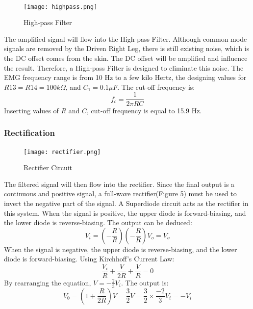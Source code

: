 \documentclass[12pt]{article}
\begin{document}
    \paragraph{}
    \begin{wrapfigure}{c}{2.5cm}
    \texttt{[image: highpass.png]}
    \caption{High-pass Filter}
    \end{wrapfigure}
    The amplified signal will flow into the High-pass Filter. Although common mode signals are removed by the Driven Right Leg, there is still existing noise, which is the  DC offset comes from the skin. The DC offset will be amplified and influence the result. Therefore, a High-pass Filter is designed to eliminate this noise. The EMG frequency range is from 10 Hz to a few kilo Hertz, the designing values for $R13=R14=100k\Omega$, and $C_1=0.1\mu F$. The cut-off frequency is:
    \begin{equation}
                    f_c = \frac{1}{2 \pi R C}
    \end{equation}
    Inserting values of $R$ and $C$, cut-off frequency is equal to 15.9 Hz.
    
    \subsubsection{Rectification}
    \paragraph{}
    \begin{figure}[H]
            \centering
            \texttt{[image: rectifier.png]}
            \caption{Rectifier Circuit}
        \end{figure}
    The filtered signal will then flow into the rectifier. Since the final output is a continuous and positive signal, a full-wave rectifier(Figure 5) must be used to invert the negative part of the signal. A Superdiode circuit acts as the rectifier in this system. When the signal is positive, the upper diode is forward-biasing, and the lower diode is reverse-biasing. The output can be deduced:
    \begin{equation}
                   V_i=\left ( -\frac{R}{R} \right )\left ( -\frac{R}{R} \right )V_o=V_o
    \end{equation}
    When the signal is negative, the upper diode is reverse-biasing, and the lower diode is forward-biasing. Using Kirchhoff's Current Law:
    \begin{equation}
                  \frac{V_i}{R}+\frac{V}{2R}+\frac{V}{R}=0
    \end{equation}
    By rearranging the equation, $V=-\frac{2}{3}V_i$. The output is:
    \begin{equation}
                 V_0=\left ( 1+\frac{R}{2R} \right )V=\frac{3}{2}V=\frac{3}{2}\times \frac{-2}{3}V_i=-V_i
    \end{equation}
    
\end{document}
